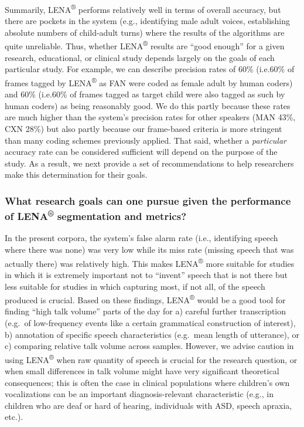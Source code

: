 \documentclass[english,table,man,floatsintext]{apa6}
\begin{document}
Summarily, LENA\textsuperscript{®} performs relatively well in terms of
overall accuracy, but there are pockets in the system (e.g., identifying
male adult voices, establishing absolute numbers of child-adult turns)
where the results of the algorithms are quite unreliable. Thus, whether
LENA\textsuperscript{®} results are \enquote{good enough} for a given
research, educational, or clinical study depends largely on the goals of
each particular study. For example, we can describe precision rates of
60\% (i.e.60\% of frames tagged by LENA\textsuperscript{®} as FAN were
coded as female adult by human coders) and 60\% (i.e.60\% of frames
tagged as target child were also tagged as such by human coders) as
being reasonably good. We do this partly because these rates are much
higher than the system's precision rates for other speakers (MAN 43\%,
CXN 28\%) but also partly because our frame-based criteria is more
stringent than many coding schemes previously applied. That said,
whether a \emph{particular} accuracy rate can be considered sufficient
will depend on the purpose of the study. As a result, we next provide a
set of recommendations to help researchers make this determination for
their goals.

\subsubsection{\texorpdfstring{What research goals can one pursue given
the performance of LENA\textsuperscript{®} segmentation and
metrics?}{What research goals can one pursue given the performance of LENA® segmentation and metrics?}}\label{what-research-goals-can-one-pursue-given-the-performance-of-lena-segmentation-and-metrics}

In the present corpora, the system's false alarm rate (i.e., identifying
speech where there was none) was very low while its miss rate (missing
speech that was actually there) was relatively high. This makes
LENA\textsuperscript{®} more suitable for studies in which it is
extremely important not to \enquote{invent} speech that is not there but
less suitable for studies in which capturing most, if not all, of the
speech produced is crucial. Based on these findings,
LENA\textsuperscript{®} would be a good tool for finding \enquote{high
talk volume} parts of the day for a) careful further transcription
(e.g.~of low-frequency events like a certain grammatical construction of
interest), b) annotation of specific speech characteristics (e.g.~mean
length of utterance), or c) comparing relative talk volume across
samples. However, we advise caution in using LENA\textsuperscript{®}
when raw quantity of speech is crucial for the research question, or
when small differences in talk volume might have very significant
theoretical consequences; this is often the case in clinical populations
where children's own vocalizations can be an important
diagnosis-relevant characteristic (e.g., in children who are deaf or
hard of hearing, individuals with ASD, speech apraxia, etc.).
\end{document}
